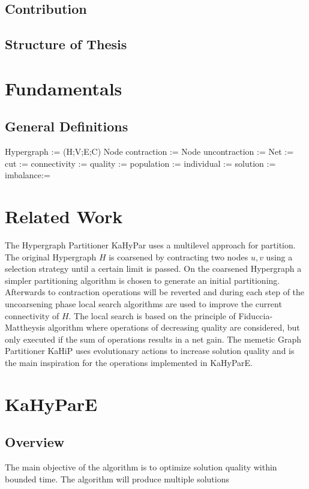\documentclass[a4paper,12pt,bibtotoc,titlepage, liststotoc,BCOR7mm,headsepline,pointlessnumbers]{scrbook}
\numberwithin{equation}{section}
\begin{document}
\section{Contribution}
\section{Structure of Thesis}
\chapter{Fundamentals}
\section{General Definitions}
Hypergraph := (H;V;E;C)
Node contraction := 
Node uncontraction := 
Net :=
cut :=
connectivity :=
quality :=
population :=
individual :=
solution := 
imbalance:= 
\chapter{Related Work}
The Hypergraph Partitioner KaHyPar uses a multilevel approach for partition. The original Hypergraph $H$ is coarsened by contracting two nodes $u,v$ using 
a selection strategy until a certain limit is passed. %
On the coarsened Hypergraph a simpler partitioning algorithm is chosen to generate an initial partitioning. Afterwards to contraction operations will be reverted and 
during each step of the uncoarsening phase local search algorithms are used to improve the current connectivity of $H$. The local search is based on the principle of
Fiduccia-Mattheysis algorithm where operations of decreasing quality are considered, but only executed if the sum of operations results in a net gain.
\newline
The memetic Graph Partitioner KaHiP uses evolutionary actions to increase solution quality and is the main inspiration for the operations implemented in KaHyParE.
\chapter{KaHyParE}
\section{Overview}
The main objective of the algorithm is to optimize solution quality within bounded time. The algorithm will produce multiple solutions 
\end{document}
